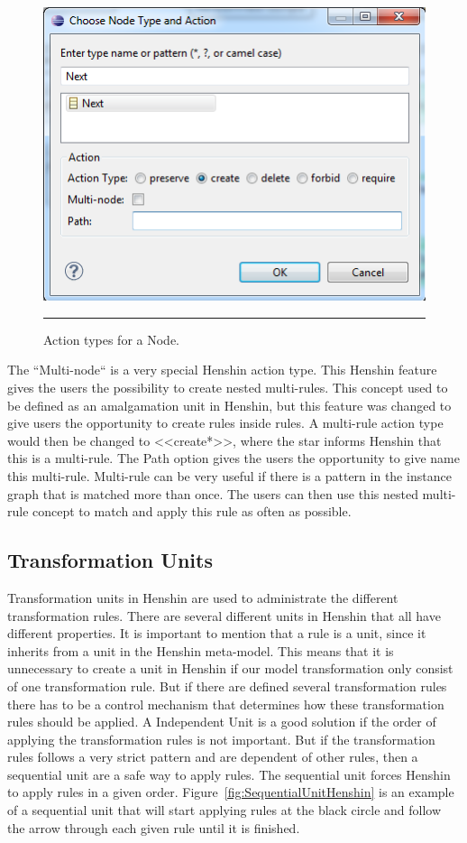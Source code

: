 \begin{figure}[H]
	\centering
	\includegraphics[scale=0.5]{figures/Henshin_Action.png}
	\rule{35em}{0.5pt}
	\caption[Action type for Henshin]
	{Action types for a Node.}
	\label{fig:HenshinAction}
\end{figure}

The ``Multi-node`` is a very special Henshin action type. This Henshin
feature gives the users the possibility to create nested multi-rules. This
concept used to be defined as an amalgamation unit in Henshin, but this feature
was changed to give users the opportunity to create rules inside rules. A
multi-rule action type would then be changed to <<create*>>, where the star
informs Henshin that this is a multi-rule. The Path option gives the users
the opportunity to give name this multi-rule. Multi-rule can be very useful if
there is a pattern in the instance graph that is matched more than once. The
users can then use this nested multi-rule concept to match and apply this rule
as often as possible.

\subsection{Transformation Units}
Transformation units in Henshin are used to administrate the different
transformation rules. There are several different units in Henshin that all have
different properties. It is important to mention that a rule is a unit,
since it inherits from a unit in the Henshin meta-model. This means that it is
unnecessary to create a unit in Henshin if our model transformation only
consist of one transformation rule. But if there are defined several
transformation rules there has to be a control mechanism that determines how
these transformation rules should be applied. A Independent Unit is a good
solution if the order of applying the transformation rules is not important.
But if the transformation rules follows a very strict pattern and are dependent
of other rules, then a sequential unit are a safe way to apply rules. The
sequential unit forces Henshin to apply rules in a given order.
Figure~\ref{fig:SequentialUnitHenshin} is an example of a sequential unit
that will start applying rules at the black circle and follow the arrow
through each given rule until it is finished.  

